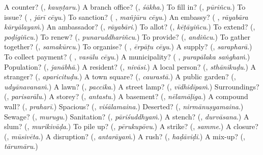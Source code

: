 \begin{tcolorbox}[breakable,colback=teal!4,colframe=teal!35!black,title={Before you move on}]
A counter? (\textbf{}, \emph{kauṇṭaru}.) A branch office? (\textbf{}, \emph{śākha}.) To fill in? (\textbf{}, \emph{pūriñcu}.) To issue? (\textbf{ }, \emph{jārī cēyu}.) To sanction? (\textbf{ }, \emph{mañjūru cēyu}.) An embassy? (\textbf{ }, \emph{rāyabāra kāryālayaṁ}.) An ambassador? (\textbf{}, \emph{rāyabāri}.) To allot? (\textbf{}, \emph{kēṭāyiñcu}.) To extend? (\textbf{}, \emph{poḍigiñcu}.) To renew? (\textbf{}, \emph{punaruddhariñcu}.) To provide? (\textbf{}, \emph{andiñcu}.) To gather together? (\textbf{}, \emph{samakūrcu}.) To organise? (\textbf{ }, \emph{ērpāṭu cēyu}.) A supply? (\textbf{}, \emph{sarapharā}.) To collect payment? (\textbf{ }, \emph{vasūlu cēyu}.) A municipality? (\textbf{ }, \emph{purapālaka saṅghaṁ}.) Population? (\textbf{}, \emph{janābhā}.) A resident? (\textbf{}, \emph{nivāsi}.) A local person? (\textbf{}, \emph{sthānikuḍu}.) A stranger? (\textbf{}, \emph{aparicituḍu}.) A town square? (\textbf{}, \emph{caurastā}.) A public garden? (\textbf{}, \emph{udyānavanaṁ}.) A lawn? (\textbf{}, \emph{paccika}.) A street lamp? (\textbf{}, \emph{vīdhidīpaṁ}.) Surroundings? (\textbf{}, \emph{parisarālu}.) A storey? (\textbf{}, \emph{antastu}.) A basement? (\textbf{}, \emph{nēlamāḷiga}.) A compound wall? (\textbf{}, \emph{praharī}.) Spacious? (\textbf{}, \emph{viśālamaina}.) Deserted? (\textbf{}, \emph{nirmānuṣyamaina}.) Sewage? (\textbf{}, \emph{murugu}.) Sanitation? (\textbf{}, \emph{pāriśuddhyaṁ}.) A stench? (\textbf{}, \emph{durvāsana}.) A slum? (\textbf{}, \emph{murikivāḍa}.) To pile up? (\textbf{}, \emph{pērukupōvu}.) A strike? (\textbf{}, \emph{samme}.) A closure? (\textbf{}, \emph{mūsivēta}.) A disruption? (\textbf{}, \emph{antarāyaṁ}.) A rush? (\textbf{}, \emph{haḍāviḍi}.) A mix-up? (\textbf{}, \emph{tārumāru}.)
\end{tcolorbox}
